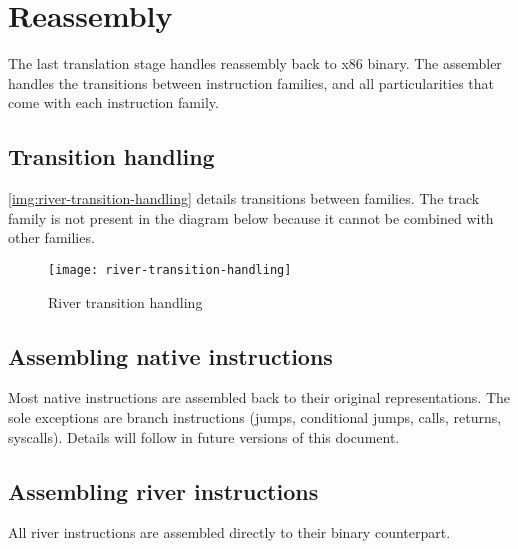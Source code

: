 \documentclass[12pt]{report}
\begin{document}
\section{Reassembly}
\label{sec:reassembly}
The last translation stage handles reassembly back to x86 binary. The assembler handles the transitions between instruction families, and all particularities that come with each instruction family.\\

\subsection{Transition handling}
\autoref{img:river-transition-handling} details transitions between families. The track family is not present in the diagram below because it cannot be combined with other families.\\
\begin{figure}[h]
	\texttt{[image: river-transition-handling]}
	\label{img:river-transition-handling}
	\caption{River transition handling}
\end{figure}

\subsection{Assembling native instructions}
\label{ssec:assembling-native-instructions}
Most native instructions are assembled back to their original representations. The sole exceptions are branch instructions (jumps, conditional jumps, calls, returns, syscalls). Details will follow in future versions of this document.\\

\subsection{Assembling river instructions}
All river instructions are assembled directly to their binary counterpart.\\
\end{document}
